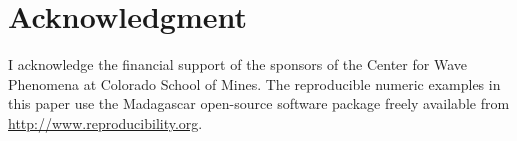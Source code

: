 \section{Acknowledgment}
I acknowledge the financial support of the sponsors of the Center for
Wave Phenomena at Colorado School of Mines. The reproducible numeric
examples in this paper use the Madagascar open-source software package
freely available from \url{http://www.reproducibility.org}.

